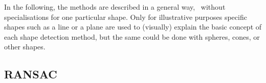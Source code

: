In the following, the methods are described in a general way, \ie\ without specialisations for one particular shape.
Only for illustrative purposes specific shapes such as a line or a plane are used to (visually) explain the basic concept of each shape detection method, but the same could be done with spheres, cones, or other shapes.




\subsection{RANSAC}%

